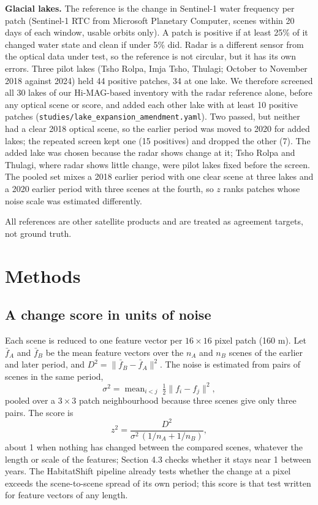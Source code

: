 \documentclass[11pt]{article}
\begin{document}
\textbf{Glacial lakes.} The reference is the change in Sentinel-1 water frequency per patch (Sentinel-1 RTC from Microsoft Planetary Computer, scenes within 20 days of each window, usable orbits only). A patch is positive if at least 25\% of it changed water state and clean if under 5\% did. Radar is a different sensor from the optical data under test, so the reference is not circular, but it has its own errors. Three pilot lakes (Tsho Rolpa, Imja Tsho, Thulagi; October to November 2018 against 2024) held 44 positive patches, 34 at one lake. We therefore screened all 30 lakes of our Hi-MAG-based inventory \cite{chen2021himag} with the radar reference alone, before any optical scene or score, and added each other lake with at least 10 positive patches (\texttt{studies/lake\_expansion\_amendment.yaml}). Two passed, but neither had a clear 2018 optical scene, so the earlier period was moved to 2020 for added lakes; the repeated screen kept one (15 positives) and dropped the other (7). The added lake was chosen because the radar shows change at it; Tsho Rolpa and Thulagi, where radar shows little change, were pilot lakes fixed before the screen. The pooled set mixes a 2018 earlier period with one clear scene at three lakes and a 2020 earlier period with three scenes at the fourth, so $z$ ranks patches whose noise scale was estimated differently.

All references are other satellite products and are treated as agreement targets, not ground truth.

\section{Methods}

\subsection{A change score in units of noise}

Each scene is reduced to one feature vector per $16 \times 16$ pixel patch (160 m). Let $\bar f_A$ and $\bar f_B$ be the mean feature vectors over the $n_A$ and $n_B$ scenes of the earlier and later period, and $D^2 = \lVert \bar f_B - \bar f_A \rVert^2$. The noise is estimated from pairs of scenes in the same period, \[\sigma^2 = \operatorname{mean}_{i<j}\ \tfrac{1}{2}\lVert f_i - f_j \rVert^2,\] pooled over a $3\times 3$ patch neighbourhood because three scenes give only three pairs. The score is \[z^2 = \frac{D^2}{\sigma^2\,(1/n_A + 1/n_B)},\] about 1 when nothing has changed between the compared scenes, whatever the length or scale of the features; Section 4.3 checks whether it stays near 1 between years. The HabitatShift pipeline \cite{habitatshift2026} already tests whether the change at a pixel exceeds the scene-to-scene spread of its own period; this score is that test written for feature vectors of any length.
\end{document}
